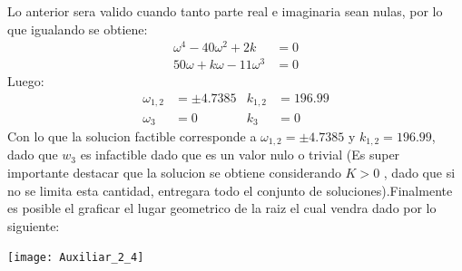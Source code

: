 \documentclass[
  11pt,
  letterpaper,
   addpoints,
   answers
  ]{exam}
\begin{document}
\begin{questions}
\begin{solution}
Lo anterior sera valido cuando tanto parte real e imaginaria sean nulas, por lo que igualando se obtiene:
\begin{align}
    \omega^{4}-40\omega^{2}+2k &= 0\\
    50\omega +k\omega-11\omega^{3} &= 0
\end{align}
Luego:
\begin{align}
    \omega_{1,2} &= \pm 4.7385 & k_{1,2}&= 196.99\\
    \omega_{3} &= 0 & k_{3}&= 0
\end{align}
Con lo que la solucion factible corresponde a $\omega_{1,2} = \pm 4.7385$ y $k_{1,2}= 196.99$, dado que $w_{3}$ es infactible dado que es un valor nulo o trivial (Es super importante destacar que la solucion se obtiene considerando $K>0$ , dado que si no se limita esta cantidad, entregara todo el conjunto de soluciones).Finalmente es posible el graficar el lugar geometrico de la raiz el cual vendra dado por lo siguiente:
\begin{center}
    \texttt{[image: Auxiliar\_2\_4]}
  \end{center}

\end{solution}
\end{questions}
\end{document}
